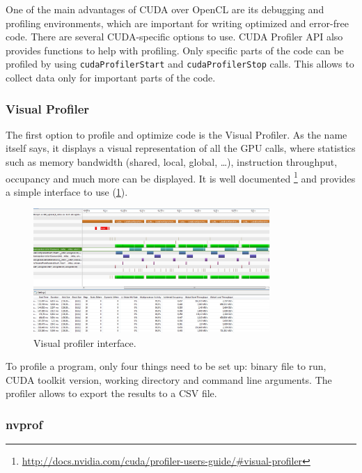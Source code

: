 One of the main advantages of CUDA over OpenCL are its debugging and profiling environments, which are important for writing optimized and error-free code. There are several CUDA-specific options to use. CUDA Profiler API also provides functions to help with profiling. Only specific parts of the code can be profiled by using \verb|cudaProfilerStart| and \verb|cudaProfilerStop| calls. This allows to collect data only for important parts of the code.

\subsubsection{Visual Profiler}\label{subsubsec:visual-profiler}

The first option to profile and optimize code is the Visual Profiler. As the name itself says, it displays a visual representation of all the GPU calls, where statistics such as memory bandwidth (shared, local, global, \dots), instruction throughput, occupancy and much more can be displayed. It is well documented \footnote{\url{http://docs.nvidia.com/cuda/profiler-users-guide/\#visual-profiler}} and provides a simple interface to use (\ref{fig:visual-profiler}). 

\begin{figure}[h]
	\begin{center}
	\includegraphics[width=0.8\textwidth]{fig/visual_profiler.jpg}
	\caption{Visual profiler interface.}
	\label{fig:visual-profiler}
	\end{center}
\end{figure}


To profile a program, only four things need to be set up: binary file to run, CUDA toolkit version, working directory and command line arguments. The profiler allows to export the results to a CSV file.

\subsubsection{nvprof}\label{subsubsec:nvprof}

